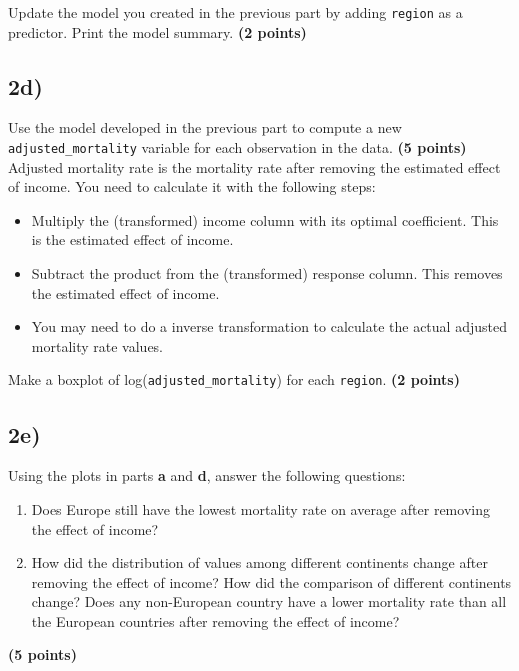 \documentclass[
  letterpaper,
  DIV=11,
  numbers=noendperiod]{scrreprt}
\providecommand{\tightlist}{%
  \setlength{\itemsep}{0pt}\setlength{\parskip}{0pt}}\usepackage{longtable,booktabs,array}
\begin{document}
Update the model you created in the previous part by adding
\texttt{region} as a predictor. Print the model summary. \textbf{(2
points)}

\subsection{2d)}\label{d-3}

Use the model developed in the previous part to compute a new
\texttt{adjusted\_mortality} variable for each observation in the data.
\textbf{(5 points)} Adjusted mortality rate is the mortality rate after
removing the estimated effect of income. You need to calculate it with
the following steps:

\begin{itemize}
\tightlist
\item
  Multiply the (transformed) income column with its optimal coefficient.
  This is the estimated effect of income.
\item
  Subtract the product from the (transformed) response column. This
  removes the estimated effect of income.
\item
  You may need to do a inverse transformation to calculate the actual
  adjusted mortality rate values.
\end{itemize}

Make a boxplot of log(\texttt{adjusted\_mortality}) for each
\texttt{region}. \textbf{(2 points)}

\subsection{2e)}\label{e-2}

Using the plots in parts \textbf{a} and \textbf{d}, answer the following
questions:

\begin{enumerate}
\def\labelenumi{(\roman{enumi})}
\item
  Does Europe still have the lowest mortality rate on average after
  removing the effect of income?
\item
  How did the distribution of values among different continents change
  after removing the effect of income? How did the comparison of
  different continents change? Does any non-European country have a
  lower mortality rate than all the European countries after removing
  the effect of income?
\end{enumerate}

\textbf{(5 points)}
\end{document}
